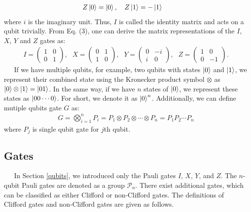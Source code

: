 \documentclass[a4paper,11pt]{ltjsarticle}
\begin{document}
{{\begin{align}
            &Z\ket{0}=\ket{0},\ \ \ Z\ket{1}=-\ket{1}\nonumber
        \end{align}
        where $i$ is the imaginary unit. Thus, $I$ is called the identity matrix and acts on a qubit trivially. From Eq. (3), one can derive the matrix representations of the $I$, $X$, $Y$ and $Z$ gates as:
        \begin{align}
            I=\left(\begin{array}{cc}
                1&0\\
                0&1
            \end{array}\right),\ \ \ 
            X=\left(\begin{array}{cc}
                0&1\\
                1&0
            \end{array}\right),\ \ \ 
            Y=\left(\begin{array}{cc}
                0&-i\\
                i&0
            \end{array}\right),\ \ \ 
            Z=\left(\begin{array}{cc}
                1&0\\
                0&-1
            \end{array}\right).
        \end{align}
        \ \ \ If we have multiple qubits, for example, two qubits with states $\ket{0}$ and $\ket{1}$, we represent their combined state using the Kronecker product symbol $\otimes$ as $\ket{0} \otimes \ket{1} = \ket{01}$. In the same way, if we have $n$ states of $\ket{0}$, we represent these states as $\ket{00\cdots 0}$. For short, we denote it as $\ket{0}^n$. Additionally, we can define mutiple qubits gate $G$ as:
        \begin{align}
            G = \bigotimes^n_{i=1}{P_i}=P_1\otimes P_2\otimes\cdots \otimes P_n=P_1P_2\cdots P_n
        \end{align}
        where $P_j$ is single qubit gate for $j$th qubit.
    }
    \subsection{Gates}\label{gates}{
        \ \ \ In Section \ref{qubits}, we introduced only the Pauli gates $I$, $X$, $Y$, and $Z$. The $n$-qubit Pauli gates are denoted as a group $\mathcal{P}_n$. There exist additional gates, which can be classified as either Clifford or non-Clifford gates. The definitions of Clifford gates and non-Clifford gates are given as follows.

}}
\end{document}
